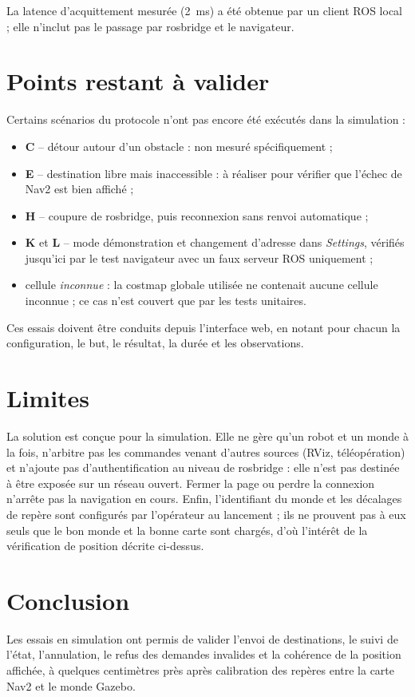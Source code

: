 La latence d'acquittement mesurée (2~ms) a été obtenue par un client ROS local ; elle
n'inclut pas le passage par rosbridge et le navigateur.

\section{Points restant à valider}
Certains scénarios du protocole n'ont pas encore été exécutés dans la simulation :
\begin{itemize}
  \item \textbf{C} -- détour autour d'un obstacle : non mesuré spécifiquement ;
  \item \textbf{E} -- destination libre mais inaccessible : à réaliser pour vérifier que
    l'échec de Nav2 est bien affiché ;
  \item \textbf{H} -- coupure de rosbridge, puis reconnexion sans renvoi automatique ;
  \item \textbf{K} et \textbf{L} -- mode démonstration et changement d'adresse dans
    \emph{Settings}, vérifiés jusqu'ici par le test navigateur avec un faux serveur ROS
    uniquement ;
  \item cellule \emph{inconnue} : la costmap globale utilisée ne contenait aucune cellule
    inconnue ; ce cas n'est couvert que par les tests unitaires.
\end{itemize}
Ces essais doivent être conduits depuis l'interface web, en notant pour chacun la
configuration, le but, le résultat, la durée et les observations.

\section{Limites}
La solution est conçue pour la simulation. Elle ne gère qu'un robot et un monde à la
fois, n'arbitre pas les commandes venant d'autres sources (RViz, téléopération) et
n'ajoute pas d'authentification au niveau de rosbridge : elle n'est pas destinée à être
exposée sur un réseau ouvert. Fermer la page ou perdre la connexion n'arrête pas la
navigation en cours. Enfin, l'identifiant du monde et les décalages de repère sont
configurés par l'opérateur au lancement ; ils ne prouvent pas à eux seuls que le bon monde
et la bonne carte sont chargés, d'où l'intérêt de la vérification de position décrite
ci-dessus.

\section*{Conclusion}
Les essais en simulation ont permis de valider l'envoi de destinations, le suivi de
l'état, l'annulation, le refus des demandes invalides et la cohérence de la position
affichée, à quelques centimètres près après calibration des repères entre la carte Nav2 et
le monde Gazebo.
